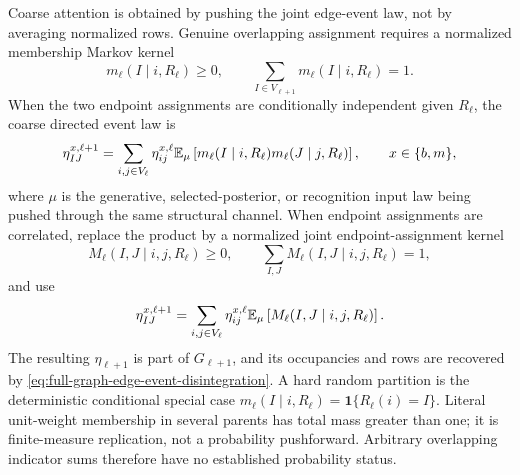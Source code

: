 Coarse attention is obtained by pushing the joint edge-event law, not by
averaging normalized rows. Genuine overlapping assignment requires a
normalized membership Markov kernel
\begin{equation}
m_\ell(I\mid i,R_\ell)\geq0,
\qquad
\sum_{I\in V_{\ell+1}}m_\ell(I\mid i,R_\ell)=1.
\label{eq:full-graph-membership-kernel}
\end{equation}
When the two endpoint assignments are conditionally independent given
$R_\ell$, the coarse directed event law is
\begin{equation}
\eta_{IJ}^{x,\ell+1}
=\sum_{i,j\in V_\ell}\eta_{ij}^{x,\ell}
\mathbb E_\mu\left[
m_\ell(I\mid i,R_\ell)m_\ell(J\mid j,R_\ell)
\right],
\qquad x\in\{b,m\},
\label{eq:full-graph-edge-pushforward}
\end{equation}
where $\mu$ is the generative, selected-posterior, or recognition input law
being pushed through the same structural channel. When endpoint assignments
are correlated, replace the product by a normalized joint endpoint-assignment
kernel
\begin{equation}
M_\ell(I,J\mid i,j,R_\ell)\geq0,
\qquad
\sum_{I,J}M_\ell(I,J\mid i,j,R_\ell)=1,
\label{eq:full-graph-joint-endpoint-kernel}
\end{equation}
and use
\begin{equation}
\eta_{IJ}^{x,\ell+1}
=\sum_{i,j\in V_\ell}\eta_{ij}^{x,\ell}
\mathbb E_\mu\left[M_\ell(I,J\mid i,j,R_\ell)\right].
\label{eq:full-graph-correlated-edge-pushforward}
\end{equation}
The resulting $\eta_{\ell+1}$ is part of $G_{\ell+1}$, and its occupancies and
rows are recovered by \eqref{eq:full-graph-edge-event-disintegration}. A hard
random partition is the deterministic conditional special case
$m_\ell(I\mid i,R_\ell)=\mathbf 1\{R_\ell(i)=I\}$. Literal unit-weight
membership in several parents has total mass greater than one; it is
finite-measure replication, not a probability pushforward. Arbitrary
overlapping indicator sums therefore have no established probability status.

